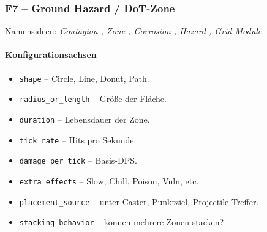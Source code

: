 \subsubsection{F7 – Ground Hazard / DoT-Zone}
Namensideen: \emph{Contagion-, Zone-, Corrosion-, Hazard-, Grid-Module}

\paragraph{Konfigurationsachsen}{}

\begin{itemize}
	\item \texttt{shape} – Circle, Line, Donut, Path.
	\item \texttt{radius\_or\_length} – Größe der Fläche.
	\item \texttt{duration} – Lebensdauer der Zone.
	\item \texttt{tick\_rate} – Hits pro Sekunde.
	\item \texttt{damage\_per\_tick} – Basis-DPS.
	\item \texttt{extra\_effects} – Slow, Chill, Poison, Vuln, etc.
	\item \texttt{placement\_source} – unter Caster, Punktziel, Projectile-Treffer.
	\item \texttt{stacking\_behavior} – können mehrere Zonen stacken?
\end{itemize}


